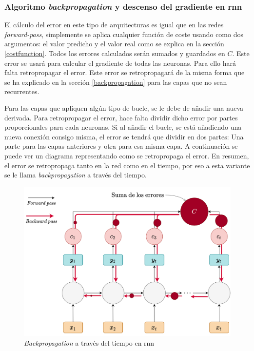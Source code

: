 \subsubsection{Algoritmo \textit{backpropagation} y descenso del gradiente en \acrshort{rnn}}
El cálculo del error en este tipo de arquitecturas es igual que en las redes \textit{forward-pass}, simplemente se aplica cualquier función de coste usando como dos argumentos: el valor predicho y el valor real como se explica en la sección \ref{costfunction}. Todos los errores calculados serán sumados y guardados en $C$. Este error se usará para calcular el gradiente de todas las neuronas. Para ello hará falta retropropagar el error. Este error se retropropagará de la misma forma que se ha explicado en la sección \ref{backpropagation} para las capas que no sean recurrentes.
\newline

Para las capas que apliquen algún tipo de bucle, se le debe de añadir una nueva derivada. Para retropropagar el error, hace falta dividir dicho error por partes proporcionales para cada neuronas. Si al añadir el bucle, se está añadiendo una nueva conexión consigo misma, el error se tendrá que dividir en dos partes: Una parte para las capas anteriores y otra para esa misma capa. A continuación se puede ver un diagrama representando como se retropropaga el error. En resumen, el error se retropropaga tanto en la red como en el tiempo, por eso a esta variante se le llama \textit{backpropagation} a través del tiempo.


\begin{figure}[H]
    \centering
    \includegraphics[width=14cm]{images/state-of-art/rnn/rnn-backward.png}
    \caption{\textit{Backpropagation} a través del tiempo en \acrshort{rnn}}
    \label{fig:Backpropagation_through_time}
\end{figure}

